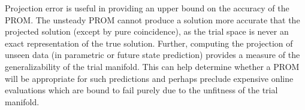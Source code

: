 Projection error is useful in providing an upper bound on the accuracy of the PROM. The unsteady PROM cannot produce a solution more accurate that the projected solution (except by pure coincidence), as the trial space is never an exact representation of the true solution. Further, computing the projection of unseen data (in parametric or future state prediction) provides a measure of the generalizability of the trial manifold. This can help determine whether a PROM will be appropriate for such predictions and perhaps preclude expensive online evaluations which are bound to fail purely due to the unfitness of the trial manifold.